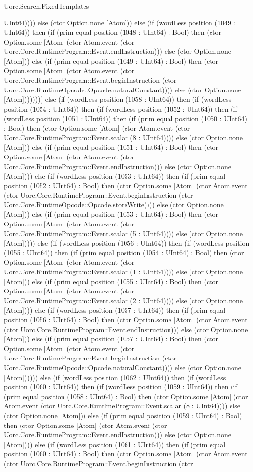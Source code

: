 \begin{lexlean}{Uorc.Search.FixedTemplates}
\begin{semanticmodule}
{UInt64)))) else (ctor Option.none [Atom])) else (if (wordLess position (1049 : UInt64)) then (if (prim equal position (1048 : UInt64) : Bool) then (ctor Option.some [Atom] (ctor Atom.event (ctor Uorc.Core.RuntimeProgram::Event.endInstruction))) else (ctor Option.none [Atom])) else (if (prim equal position (1049 : UInt64) : Bool) then (ctor Option.some [Atom] (ctor Atom.event (ctor Uorc.Core.RuntimeProgram::Event.beginInstruction (ctor Uorc.Core.RuntimeOpcode::Opcode.naturalConstant)))) else (ctor Option.none [Atom]))))))) else (if (wordLess position (1058 : UInt64)) then (if (wordLess position (1054 : UInt64)) then (if (wordLess position (1052 : UInt64)) then (if (wordLess position (1051 : UInt64)) then (if (prim equal position (1050 : UInt64) : Bool) then (ctor Option.some [Atom] (ctor Atom.event (ctor Uorc.Core.RuntimeProgram::Event.scalar (8 : UInt64)))) else (ctor Option.none [Atom])) else (if (prim equal position (1051 : UInt64) : Bool) then (ctor Option.some [Atom] (ctor Atom.event (ctor Uorc.Core.RuntimeProgram::Event.endInstruction))) else (ctor Option.none [Atom]))) else (if (wordLess position (1053 : UInt64)) then (if (prim equal position (1052 : UInt64) : Bool) then (ctor Option.some [Atom] (ctor Atom.event (ctor Uorc.Core.RuntimeProgram::Event.beginInstruction (ctor Uorc.Core.RuntimeOpcode::Opcode.storeWrite)))) else (ctor Option.none [Atom])) else (if (prim equal position (1053 : UInt64) : Bool) then (ctor Option.some [Atom] (ctor Atom.event (ctor Uorc.Core.RuntimeProgram::Event.scalar (5 : UInt64)))) else (ctor Option.none [Atom])))) else (if (wordLess position (1056 : UInt64)) then (if (wordLess position (1055 : UInt64)) then (if (prim equal position (1054 : UInt64) : Bool) then (ctor Option.some [Atom] (ctor Atom.event (ctor Uorc.Core.RuntimeProgram::Event.scalar (1 : UInt64)))) else (ctor Option.none [Atom])) else (if (prim equal position (1055 : UInt64) : Bool) then (ctor Option.some [Atom] (ctor Atom.event (ctor Uorc.Core.RuntimeProgram::Event.scalar (2 : UInt64)))) else (ctor Option.none [Atom]))) else (if (wordLess position (1057 : UInt64)) then (if (prim equal position (1056 : UInt64) : Bool) then (ctor Option.some [Atom] (ctor Atom.event (ctor Uorc.Core.RuntimeProgram::Event.endInstruction))) else (ctor Option.none [Atom])) else (if (prim equal position (1057 : UInt64) : Bool) then (ctor Option.some [Atom] (ctor Atom.event (ctor Uorc.Core.RuntimeProgram::Event.beginInstruction (ctor Uorc.Core.RuntimeOpcode::Opcode.naturalConstant)))) else (ctor Option.none [Atom]))))) else (if (wordLess position (1062 : UInt64)) then (if (wordLess position (1060 : UInt64)) then (if (wordLess position (1059 : UInt64)) then (if (prim equal position (1058 : UInt64) : Bool) then (ctor Option.some [Atom] (ctor Atom.event (ctor Uorc.Core.RuntimeProgram::Event.scalar (8 : UInt64)))) else (ctor Option.none [Atom])) else (if (prim equal position (1059 : UInt64) : Bool) then (ctor Option.some [Atom] (ctor Atom.event (ctor Uorc.Core.RuntimeProgram::Event.endInstruction))) else (ctor Option.none [Atom]))) else (if (wordLess position (1061 : UInt64)) then (if (prim equal position (1060 : UInt64) : Bool) then (ctor Option.some [Atom] (ctor Atom.event (ctor Uorc.Core.RuntimeProgram::Event.beginInstruction (ctor }
\end{semanticmodule}
\end{lexlean}

